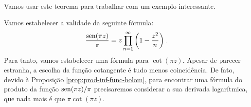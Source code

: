     Vamos usar este teorema para trabalhar com um exemplo interessante.
    \begin{exemplo}
        Vamos estabelecer a validade da seguinte fórmula:
        \begin{equation*}
            \frac{\operatorname{sen}(\pi z)}{\pi} = z\prod_{n=1}^{\infty} 
            \left( 1 - \frac{z^2}{n} \right).
        \end{equation*}
        Para tanto, vamos estabelecer uma fórmula para $\cot(\pi z)$.
        Apesar de parecer estranha, a escolha da função cotangente é tudo menos
        coincidência. De fato, devido à Proposição \ref{prop:prod-inf-func-holom},
        para encontrar uma fórmula do produto da função $\operatorname{sen}(\pi z)/\pi$ precisaremos 
        considerar a sua derivada logarítmica, que nada mais é que $\pi\cot(\pi z)$.
        

\end{exemplo}
